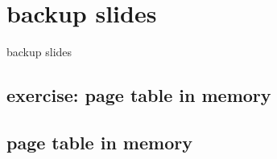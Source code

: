 


\section{backup slides}
\begin{frame}{backup slides}
\end{frame}
\subsection{exercise: page table in memory}

\subsection{page table in memory}



